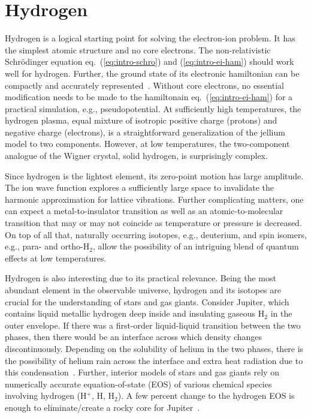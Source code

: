 \section{Hydrogen}
Hydrogen is a logical starting point for solving the electron-ion problem.
It has the simplest atomic structure and no core electrons.
The non-relativistic Schr\"odinger equation eq.~(\ref{eq:intro-schro}) and (\ref{eq:intro-ei-ham}) should work well for hydrogen. Further, the ground state of its electronic hamiltonian can be compactly and accurately represented~\cite{Holzmann2003}.
Without core electrons, no essential modification needs to be made to the hamiltonain eq.~(\ref{eq:intro-ei-ham}) for a practical simulation, e.g., pseudopotential.
At sufficiently high temperatures, the hydrogen plasma, equal mixture of isotropic positive charge (protons) and negative charge (electrons), is a straightforward generalization of the jellium model to two components. However, at low temperatures, the two-component analogue of the Wigner crystal, solid hydrogen, is surprisingly complex.

Since hydrogen is the lightest element, its zero-point motion has large amplitude. The ion wave function explores a sufficiently large space to invalidate the harmonic approximation for lattice vibrations.
Further complicating matters, one can expect a metal-to-insulator transition as well as an atomic-to-molecular transition that may or may not coincide as temperature or pressure is decreased.
On top of all that, naturally occurring isotopes, e.g., deuterium, and spin isomers, e.g., para- and ortho-H$_2$, allow the possibility of an intriguing blend of quantum effects at low temperatures.

Hydrogen is also interesting due to its practical relevance. Being the most abundant element in the observable universe, hydrogen and its isotopes are crucial for the understanding of stars and gas giants.
Consider Jupiter, which contains liquid metallic hydrogen deep inside and insulating gaseous H$_2$ in the outer envelope. If there was a first-order liquid-liquid transition between the two phases, then there would be an interface across which density changes discontinuously.
Depending on the solubility of helium in the two phases, there is the possibility of helium rain across the interface and extra heat radiation due to this condensation~\cite{Militzer_thesis}.
Further, interior models of stars and gas giants rely on numerically accurate equation-of-state (EOS) of various chemical species involving hydrogen (H$^+$, H, H$_2$).
A few percent change to the hydrogen EOS is enough to eliminate/create a rocky core for Jupiter~\cite{Hubbard2016}.

